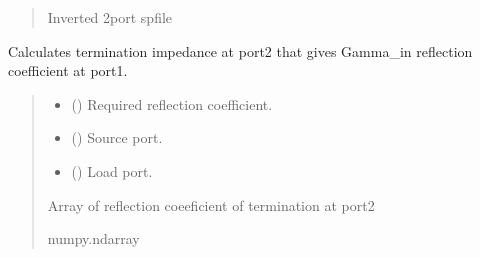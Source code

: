 \documentclass[letterpaper,10pt,english]{sphinxmanual}
\begin{document}
\begin{fulllineitems}
\begin{fulllineitems}
\begin{quote}
\begin{description}
\sphinxAtStartPar
Inverted 2\sphinxhyphen{}port spfile

\sphinxAtStartPar
{\hyperref[\detokenize{touchstone:touchstone.spfile}]{}}

\end{description}\end{quote}

\end{fulllineitems}


\begin{fulllineitems}
\label{\detokenize{touchstone:touchstone.spfile.load_impedance}}
\pysigstartsignatures
{}
\pysigstopsignatures
\sphinxAtStartPar
Calculates termination impedance at port2 that gives Gamma\_in reflection coefficient at port1.
\begin{quote}\begin{description}
\begin{itemize}
\item {} 
\sphinxAtStartPar
{} (\sphinxstyleliteralemphasis{\sphinxupquote{,}}) \textendash{} Required reflection coefficient.

\item {} 
\sphinxAtStartPar
{} () \textendash{} Source port.

\item {} 
\sphinxAtStartPar
{} () \textendash{} Load port.

\end{itemize}

\sphinxAtStartPar
Array of reflection coeeficient of termination at port2

\sphinxAtStartPar
numpy.ndarray

\end{description}\end{quote}


\end{fulllineitems}
\end{fulllineitems}
\end{document}
